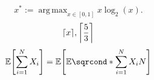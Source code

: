 \documentclass{article}
\DeclareMathOperator*{\argmax}{arg\,max}
\newcommand{\logof}[2][2]{\log_{#1}(#2)}
\DeclarePairedDelimiter{\ceiling}{\lceil}{\rceil}
\DeclarePairedDelimiter{\sqrbrckt}{[}{]}
\newcommand{\EV}[1]{\mathbb{E}\sqrbrckt*{#1}}
\newcommand{\expval}[2]{\mathbb{E}\sqrcond*{#1}{#2}}
\begin{document}
    \[ x^* := \displaystyle\argmax_{x\in[0,1]} x \logof{x}.\]
    \newline
    \[ \ceiling{x}, \ceiling*{\dfrac{5}{3}} \]
    \newline
    \[ \EV{\sum_{i=1}^N X_i} = \EV{\expval{\sum_{i=1}^N X_i}{N}} \]
\end{document}
